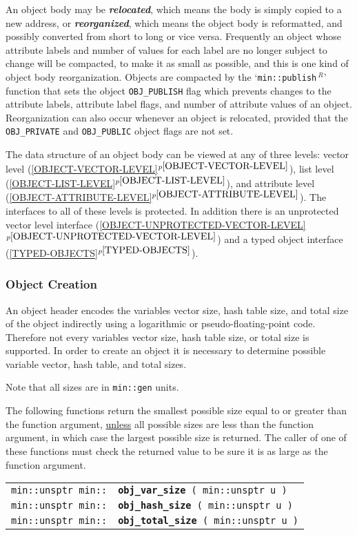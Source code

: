 \documentclass[12pt]{article}
\makeatletter
\newcommand{\smkey}[3]{{\bf \em #1#2}\index{#1!#3}}
\newcommand{\ttindex}[1]{\index{#1@{\tt #1}}}
\newcommand{\minindex}[1]{\ttindex{min::#1}\ttindex{#1}}
\newcommand{\itemref}[1]{\ref{#1}$^{p\pageref{#1}}$}
\newcommand{\EOL}{\penalty \exhyphenpenalty}
\newenvironment{indpar}[1][0.3in]%
	{\begin{list}{}%
		     {\setlength{\itemsep}{0in}%
		      \setlength{\topsep}{0in}%
		      \setlength{\parsep}{1ex}%
		      \setlength{\labelwidth}{#1}%
		      \setlength{\leftmargin}{#1}%
		      \addtolength{\leftmargin}{\labelsep}}%
	 \item}%
	{\end{list}}
\newcommand{\LABEL}[1]{\label{#1}}
\newcommand{\MINKEY}[1]{{\tt \bf #1}\minindex{#1}}
\newcommand{\REL}{$\,^R$}
\makeatother
\begin{document}
An object body may be \smkey{relocate}d{object body}, which means the
body is simply copied to a new address, or
\smkey{reorganize}d{object body}, which means the object body is reformatted,
and possibly converted from short to long or vice versa.  Frequently an
object whose attribute labels and number of values for each label are no
longer subject to change will be compacted, to make it as small as possible,
and this is one kind of object body reorganization.
Objects are compacted by the `{\tt min::\EOL publish\REL}'
function that sets the
object {\tt OBJ\_\EOL PUBLISH} flag which prevents changes to the
attribute labels, attribute label flags, and number of attribute values
of an object.
Reorganization can also occur whenever an object is relocated,
provided that the {\tt OBJ\_\EOL PRIVATE} and
{\tt OBJ\_\EOL PUBLIC} object flags are not set.

The data structure of an object body can be viewed at any of three levels:
vector level (\itemref{OBJECT-VECTOR-LEVEL}),
list level (\itemref{OBJECT-LIST-LEVEL}),
and attribute level (\itemref{OBJECT-ATTRIBUTE-LEVEL}).
The interfaces to all of these levels is protected.  In addition
there is an unprotected vector level interface
(\itemref{OBJECT-UNPROTECTED-VECTOR-LEVEL}) and a
typed object interface (\itemref{TYPED-OBJECTS}).

\subsubsection{Object Creation}
\label{OBJECT-CREATION}

An object header encodes the variables vector size,
hash table size, and total size of the object
indirectly using a logarithmic or pseudo-floating-point code.
Therefore not every variables vector size,
hash table size, or total size is supported.
In order to create an object it is necessary to determine possible
variable vector, hash table, and total sizes.

Note that all sizes are in \verb|min::gen| units.

The following functions return the smallest
possible size equal to or greater than the function argument,
\underline{unless} all possible sizes are less than the function argument,
in which case the largest possible size is returned.  The caller of
one of these functions must check the returned value to be sure it is
as large as the function argument.

\begin{indpar}\begin{tabular}{r@{}l}
\verb|min::unsptr min::|
    & \MINKEY{obj\_var\_size}\verb| ( min::unsptr u )|
\LABEL{MIN::OBJ_VAR_SIZE} \\
\verb|min::unsptr min::|
    & \MINKEY{obj\_hash\_size}\verb| ( min::unsptr u )|
\LABEL{MIN::OBJ_HASH_SIZE} \\
\verb|min::unsptr min::|
    & \MINKEY{obj\_total\_size}\verb| ( min::unsptr u )|
\LABEL{MIN::OBJ_TOTAL_SIZE} \\
\end{tabular}\end{indpar}
\end{document}
